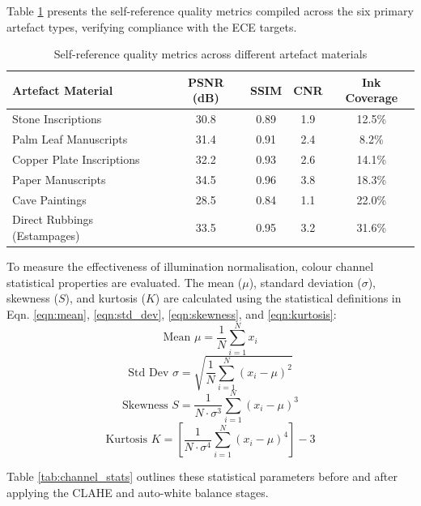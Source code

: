 Table \ref{tab:ece_quality_metrics} presents the self-reference quality metrics compiled across the six primary artefact types, verifying compliance with the ECE targets.

\begin{table}[htbp]
\centering
\fontsize{10}{12}\selectfont
\caption{Self-reference quality metrics across different artefact materials}
\label{tab:ece_quality_metrics}
\begin{tabular}{|l|c|c|c|c|}
	\hline
	Artefact Material & PSNR (dB) & SSIM & CNR & Ink Coverage \\
	\hline
	Stone Inscriptions & 30.8 & 0.89 & 1.9 & 12.5\% \\ \hline
	Palm Leaf Manuscripts & 31.4 & 0.91 & 2.4 & 8.2\% \\ \hline
	Copper Plate Inscriptions & 32.2 & 0.93 & 2.6 & 14.1\% \\ \hline
	Paper Manuscripts & 34.5 & 0.96 & 3.8 & 18.3\% \\ \hline
	Cave Paintings & 28.5 & 0.84 & 1.1 & 22.0\% \\ \hline
	Direct Rubbings (Estampages) & 33.5 & 0.95 & 3.2 & 31.6\% \\
	\hline
\end{tabular}
\end{table}

To measure the effectiveness of illumination normalisation, colour channel statistical properties are evaluated. The mean ($\mu$), standard deviation ($\sigma$), skewness ($S$), and kurtosis ($K$) are calculated using the statistical definitions in Eqn. \ref{eqn:mean}, \ref{eqn:std_dev}, \ref{eqn:skewness}, and \ref{eqn:kurtosis}:
\begin{equation}
\label{eqn:mean}
\text{Mean } \mu = \frac{1}{N} \sum_{i=1}^N x_i
\end{equation}
\begin{equation}
\label{eqn:std_dev}
\text{Std Dev } \sigma = \sqrt{\frac{1}{N} \sum_{i=1}^N (x_i - \mu)^2}
\end{equation}
\begin{equation}
\label{eqn:skewness}
\text{Skewness } S = \frac{1}{N \cdot \sigma^3} \sum_{i=1}^N (x_i - \mu)^3
\end{equation}
\begin{equation}
\label{eqn:kurtosis}
\text{Kurtosis } K = \left[ \frac{1}{N \cdot \sigma^4} \sum_{i=1}^N (x_i - \mu)^4 \right] - 3
\end{equation}

Table \ref{tab:channel_stats} outlines these statistical parameters before and after applying the CLAHE and auto-white balance stages.

